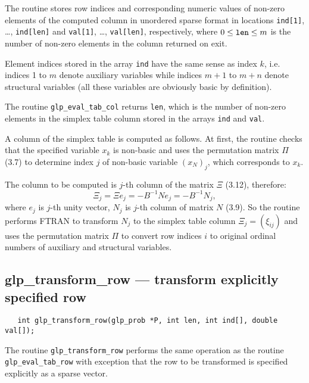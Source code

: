The routine stores row indices and corresponding numeric values of
non-zero elements of the computed column in unordered sparse format in
locations \verb|ind[1]|, \dots, \verb|ind[len]| and \verb|val[1]|,
\dots, \verb|val[len]|, respectively, where $0\leq{\tt len}\leq m$ is
the number of non-zero elements in the column returned on exit.

Element indices stored in the array \verb|ind| have the same sense as
index $k$, i.e. indices 1 to $m$ denote auxiliary variables while
indices $m+1$ to $m+n$ denote structural variables (all these variables
are obviously basic by definition).

\returns

The routine \verb|glp_eval_tab_col| returns \verb|len|, which is the
number of non-zero elements in the simplex table column stored in the
arrays \verb|ind| and \verb|val|.


A column of the simplex table is computed as follows. At first, the
routine checks that the specified variable $x_k$ is non-basic and uses
the permutation matrix $\Pi$ (3.7) to determine index $j$ of non-basic
variable $(x_N)_j$, which corresponds to $x_k$.

The column to be computed is $j$-th column of the matrix $\Xi$ (3.12),
therefore:
$$\Xi_j=\Xi e_j=-B^{-1}Ne_j=-B^{-1}N_j,$$
where $e_j$ is $j$-th unity vector, $N_j$ is $j$-th column of matrix
$N$ (3.9). So the routine performs FTRAN to transform $N_j$ to the
simplex table column $\Xi_j=(\xi_{ij})$ and uses the permutation matrix
$\Pi$ to convert row indices $i$ to original ordinal numbers of
auxiliary and structural variables.

\newpage

\subsection{glp\_transform\_row --- transform explicitly specified row}

\synopsis

\begin{verbatim}
   int glp_transform_row(glp_prob *P, int len, int ind[], double val[]);
\end{verbatim}

\description

The routine \verb|glp_transform_row| performs the same operation as the
routine \verb|glp_eval_tab_row| with exception that the row to be
transformed is specified explicitly as a sparse vector.

